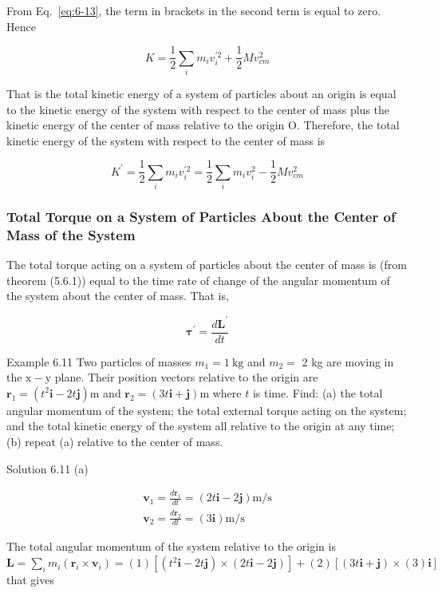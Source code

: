 \documentclass[10pt]{article}
\numberwithin{equation}{section}
\begin{document}
From Eq.~\eqref{eq:6-13}, the term in brackets in the second term is equal to zero. Hence

$$
K=\frac{1}{2} \sum_{i} m_{i} v_{i}^{\prime 2}+\frac{1}{2} M v_{c m}^{2}
$$

That is the total kinetic energy of a system of particles about an origin is equal to the kinetic energy of the system with respect to the center of mass plus the kinetic energy of the center of mass relative to the origin O. Therefore, the total kinetic energy of the system with respect to the center of mass is

$$
K^{\prime}=\frac{1}{2} \sum_{i} m_{i} v_{i}^{\prime 2}=\frac{1}{2} \sum_{i} m_{i} v_{i}^{2}-\frac{1}{2} M v_{c m}^{2}
$$

\subsubsection{Total Torque on a System of Particles About the Center of Mass of the System}\label{sec:6-4-4}
The total torque acting on a system of particles about the center of mass is (from theorem (5.6.1)) equal to the time rate of change of the angular momentum of the system about the center of mass. That is,

$$
\boldsymbol{\tau}^{\prime}=\frac{d \mathbf{L}^{\prime}}{d t}
$$

Example 6.11 Two particles of masses $m_{1}=1 \mathrm{~kg}$ and $m_{2}=$ 2 kg are moving in the $\mathrm{x}-\mathrm{y}$ plane. Their position vectors relative to the origin are $\mathbf{r}_{1}=\left(t^{2} \mathbf{i}-2 t \mathbf{j}\right) \mathrm{m}$ and $\mathbf{r}_{2}=(3 t \mathbf{i}+\mathbf{j}) \mathrm{m}$ where $t$ is time. Find: (a) the total angular momentum of the system; the total external torque acting on the system; and the total kinetic energy of the system all relative to the origin at any time; (b) repeat (a) relative to the center of mass.

Solution 6.11 (a)

$$
\begin{gathered}
\mathbf{v}_{1}=\frac{d \mathbf{r}_{1}}{d t}=(2 t \mathbf{i}-2 \mathbf{j}) \mathrm{m} / \mathrm{s} \\
\mathbf{v}_{2}=\frac{d \mathbf{r}_{2}}{d t}=(3 \mathbf{i}) \mathrm{m} / \mathrm{s}
\end{gathered}
$$

The total angular momentum of the system relative to the origin is\\
$\mathbf{L}=\sum_{i} m_{i}\left(\mathbf{r}_{i} \times \mathbf{v}_{i}\right)=(1)\left[\left(t^{2} \mathbf{i}-2 t \mathbf{j}\right) \times(2 t \mathbf{i}-2 \mathbf{j})\right]+(2)[(3 t \mathbf{i}+\mathbf{j}) \times(3) \mathbf{i}]$ that gives
\end{document}
